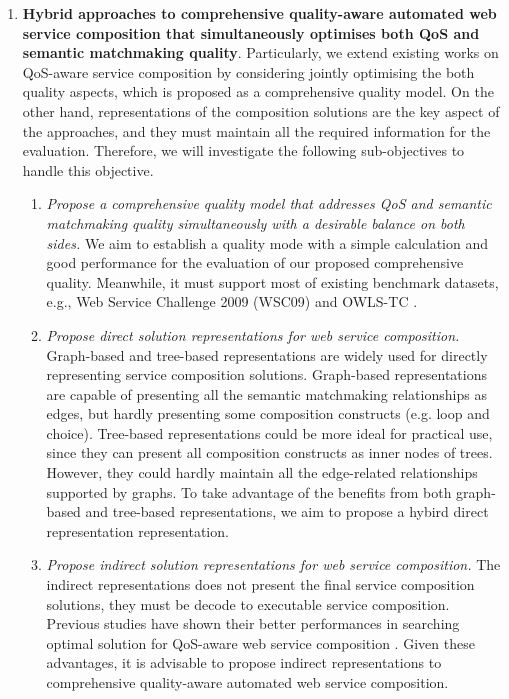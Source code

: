 \begin{enumerate}
  \item \textbf{Hybrid approaches to comprehensive quality-aware automated web service composition that simultaneously optimises both QoS and semantic matchmaking quality}. Particularly, we extend existing works on QoS-aware service composition by considering jointly optimising the both quality aspects, which is proposed as a comprehensive quality model. On the other hand, representations of the composition solutions are the key aspect of the approaches, and they must maintain all the required information for the evaluation. Therefore, we will investigate the following sub-objectives to handle this objective.
  \begin{enumerate}
    \item \emph{Propose a comprehensive quality model that addresses QoS and semantic matchmaking quality simultaneously with a desirable balance on both sides.} We aim to establish a quality mode with a simple calculation and good performance for the evaluation of our proposed comprehensive quality. Meanwhile, it must support most of existing benchmark datasets, e.g., Web Service Challenge 2009 (WSC09)\cite{kona2009wsc} and OWLS-TC \cite{kuster2008opossum}.
    
    \item \emph{Propose direct solution representations for web service composition.} Graph-based and tree-based representations are widely used for directly representing service composition solutions. Graph-based representations are capable of presenting all the semantic matchmaking relationships as edges, but hardly presenting some composition constructs (e.g. loop and choice). Tree-based representations could be more ideal for practical use, since they can present all composition constructs as inner nodes of trees. However, they could hardly maintain all the edge-related relationships supported by graphs. To take advantage of the benefits from both graph-based and tree-based representations, we aim to propose a hybird direct representation representation. 
    
    \item \emph{Propose indirect solution representations for web service composition.} The indirect representations does not present the final service composition solutions, they must be decode to executable service composition. Previous studies have shown their better performances in searching optimal solution for QoS-aware web service composition \cite{da2016memetic,da2016particle}. Given these advantages, it is advisable to propose indirect representations to comprehensive quality-aware automated web service composition.
    

\end{enumerate}
\end{enumerate}
